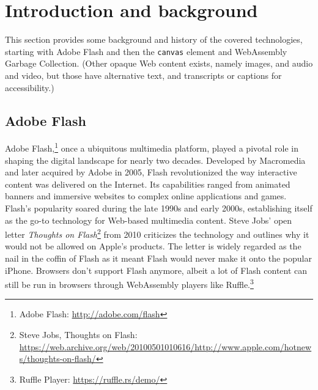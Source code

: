 \documentclass[sigconf]{acmart}
\begin{document}

\maketitle

\section{Introduction and background}

This section provides some background and history of the covered technologies, starting with Adobe Flash and then the \texttt{canvas} element and WebAssembly Garbage Collection. (Other opaque Web content exists, namely images, and audio and video, but those have alternative text, and transcripts or captions for accessibility.)

\subsection{Adobe Flash}

Adobe Flash,\footnote{Adobe Flash: \url{http://adobe.com/flash}} once a ubiquitous multimedia platform, played a pivotal role in shaping the digital landscape for nearly two decades. Developed by Macromedia and later acquired by Adobe in 2005, Flash revolutionized the way interactive content was delivered on the Internet. Its capabilities ranged from animated banners and immersive websites to complex online applications and games. Flash's popularity soared during the late 1990s and early 2000s, establishing itself as the go-to technology for Web-based multimedia content. Steve Jobs' open letter \textit{Thoughts on Flash}\footnote{Steve Jobs, Thoughts on Flash: \url{https://web.archive.org/web/20100501010616/http://www.apple.com/hotnews/thoughts-on-flash/}} from 2010 criticizes the technology and outlines why it would not be allowed on Apple's products. The letter is widely regarded as the nail in the coffin of Flash as it meant Flash would never make it onto the popular iPhone. Browsers don't support Flash anymore, albeit a lot of Flash content can still be run in browsers through WebAssembly players like Ruffle.\footnote{Ruffle Player: \url{https://ruffle.rs/demo/}}
\end{document}
